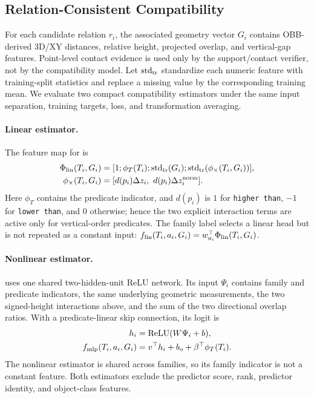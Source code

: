 \subsection{Relation-Consistent Compatibility}

For each candidate relation $r_i$, the associated geometry vector $G_i$ contains
OBB-derived 3D/XY distances, relative height, projected overlap, and
vertical-gap features. Point-level contact evidence is used only by the
support/contact verifier, not by the compatibility model. Let
$\operatorname{std}_{\rm tr}$ standardize each numeric feature with
training-split statistics and replace a missing value by the corresponding
training mean. We evaluate two compact compatibility estimators under the same
input separation, training targets, loss, and transformation averaging.

\paragraph{Linear estimator.}
The feature map for \methodlinear{} is
\begin{equation}
\begin{aligned}
\Phi_{\rm lin}(T_i,G_i)&=[1;\phi_T(T_i);\operatorname{std}_{\rm tr}(G_i);
\operatorname{std}_{\rm tr}(\phi_{\times}(T_i,G_i))],\\
\phi_{\times}(T_i,G_i)&=
[d(p_i)\Delta z_i,\ d(p_i)\Delta z_i^{\rm norm}].
\end{aligned}
\end{equation}
Here $\phi_T$ contains the predicate indicator, and $d(p_i)$ is $1$ for
\texttt{higher than}, $-1$ for \texttt{lower than}, and $0$ otherwise; hence the
two explicit interaction terms are active only for vertical-order predicates.
The family label selects a linear head but is not repeated as a constant input:
$f_{\rm lin}(T_i,a_i,G_i)=w_{a_i}^\top\Phi_{\rm lin}(T_i,G_i)$.

\paragraph{Nonlinear estimator.}
\methodmlp{} uses one shared two-hidden-unit ReLU network. Its input $\Psi_i$
contains family and predicate indicators, the same underlying geometric
measurements, the two signed-height interactions above, and the sum of the two
directional overlap ratios. With a predicate-linear skip connection, its logit is
\begin{equation}
\begin{aligned}
h_i&=\operatorname{ReLU}(W\Psi_i+b),\\
f_{\rm mlp}(T_i,a_i,G_i)&=v^\top h_i+b_o+
\beta^\top\phi_T(T_i).
\end{aligned}
\end{equation}
The nonlinear estimator is shared across families, so its family indicator is
not a constant feature. Both estimators exclude the predictor score, rank,
predictor identity, and object-class features.

